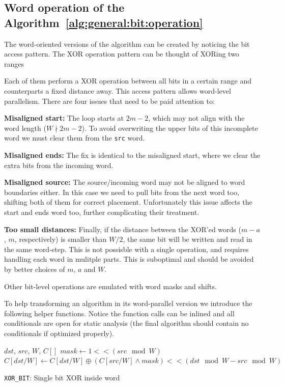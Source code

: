 \subsection{Word operation of the  Algorithm~\ref{alg:general:bit:operation}}\label{sec:word:operation}

The word-oriented versions of the algorithm can be created by noticing the bit access pattern. The XOR operation pattern can be thought of XORing two ranges

Each of them perform a XOR operation between all bits in a certain range and counterparts a fixed distance away. This access pattern allows word-level parallelism. There are four issues that need to be paid attention to:

\textbf{Misaligned start:}
The loop starts at $2m -2$, which may not align with the word length ($W \nmid 2m-2$). To avoid overwriting the upper bits of this incomplete word we must clear them from the \texttt{src} word.

\textbf{Misaligned ends:}
The fix is identical to the misaligned start, where we clear the extra bits from the incoming word.

\textbf{Misaligned source:}
The source/incoming word may not be aligned to word boundaries either. In this case we need to pull bits from the next word too, shifting both of them for correct placement. Unfortunately this issue affects the start and ends word too, further complicating their treatment.

\textbf{Too small distances:}
Finally, if the distance between the XOR'ed words ($m-a$, $m$, respectively) is smaller than $W/2$, the same bit will be written and read in the same word-step. This is not possisble with a single operation, and requires handling each word in mulitple parts. This is suboptimal and should be avoided by better choices of $m$, $a$ and $W$.

Other bit-level operations are emulated with word masks and shifts.

To help transforming an algorithm in its word-parallel version we introduce the following helper functions. Notice the function calls can be inlined and all conditionals are open for static analysis (the final algorithm should contain no conditionals if optimized properly).

\begin{algorithm}
\begin{algorithmic}[1]
  \REQUIRE $dst$, $src$, $W$, $C[]$
  \STATE $mask \gets 1 << (src \mod W)$
  \STATE $C[dst / W] \gets C[dst / W] \oplus (C[src / W] \land mask) << (dst \mod W - src \mod W)$
  \caption{\texttt{XOR\_BIT}: Single bit XOR inside word}
\end{algorithmic}
\end{algorithm}

